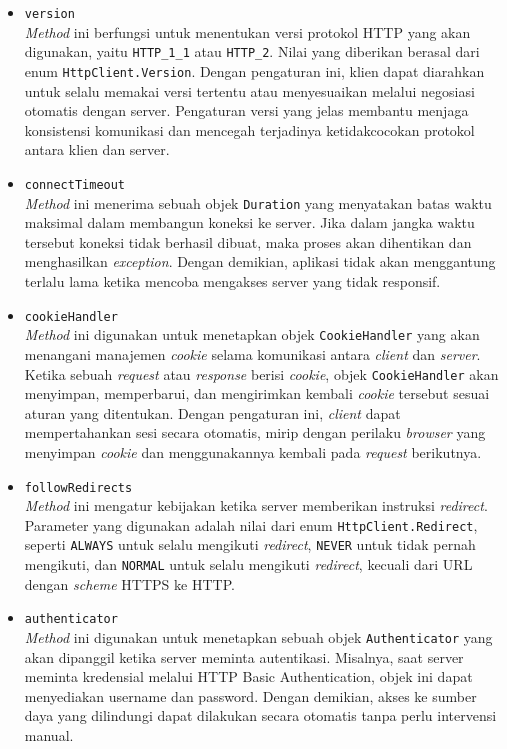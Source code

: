 \begin{itemize}
    \item \texttt{version}\\
    \textit{Method} ini berfungsi untuk menentukan versi protokol HTTP yang akan digunakan, yaitu \texttt{HTTP\_1\_1} atau \texttt{HTTP\_2}. Nilai yang diberikan berasal dari enum \texttt{HttpClient.Version}. Dengan pengaturan ini, klien dapat diarahkan untuk selalu memakai versi tertentu atau menyesuaikan melalui negosiasi otomatis dengan server. Pengaturan versi yang jelas membantu menjaga konsistensi komunikasi dan mencegah terjadinya ketidakcocokan protokol antara klien dan server.
    
    \item \texttt{connectTimeout}\\
    \textit{Method} ini menerima sebuah objek \texttt{Duration} yang menyatakan batas waktu maksimal dalam membangun koneksi ke server. Jika dalam jangka waktu tersebut koneksi tidak berhasil dibuat, maka proses akan dihentikan dan menghasilkan \textit{exception}. Dengan demikian, aplikasi tidak akan menggantung terlalu lama ketika mencoba mengakses server yang tidak responsif.
    
    \item \texttt{cookieHandler}\\
    \textit{Method} ini digunakan untuk menetapkan objek \texttt{CookieHandler} yang akan menangani manajemen \textit{cookie} selama komunikasi antara \textit{client} dan \textit{server}. Ketika sebuah \textit{request} atau \textit{response} berisi \textit{cookie}, objek \texttt{CookieHandler} akan menyimpan, memperbarui, dan mengirimkan kembali \textit{cookie} tersebut sesuai aturan yang ditentukan. Dengan pengaturan ini, \textit{client} dapat mempertahankan sesi secara otomatis, mirip dengan perilaku \textit{browser} yang menyimpan \textit{cookie} dan menggunakannya kembali pada \textit{request} berikutnya.

    \item \texttt{followRedirects}\\
    \textit{Method} ini mengatur kebijakan ketika server memberikan instruksi \textit{redirect}. Parameter yang digunakan adalah nilai dari enum \texttt{HttpClient.Redirect}, seperti \texttt{ALWAYS} untuk selalu mengikuti \textit{redirect}, \texttt{NEVER} untuk tidak pernah mengikuti, dan \texttt{NORMAL} untuk selalu mengikuti \textit{redirect}, kecuali dari URL dengan \textit{scheme} HTTPS ke HTTP.
    
    \item \texttt{authenticator}\\
    \textit{Method} ini digunakan untuk menetapkan sebuah objek \texttt{Authenticator} yang akan dipanggil ketika server meminta autentikasi. Misalnya, saat server meminta kredensial melalui HTTP Basic Authentication, objek ini dapat menyediakan username dan password. Dengan demikian, akses ke sumber daya yang dilindungi dapat dilakukan secara otomatis tanpa perlu intervensi manual.
    

\end{itemize}
